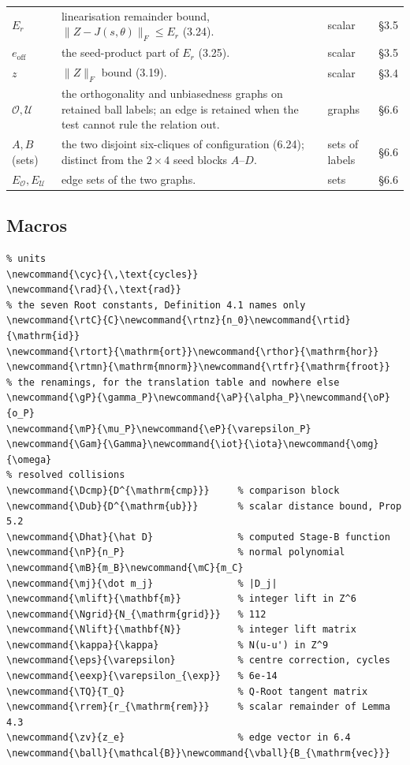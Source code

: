 \documentclass[11pt]{article}
\begin{document}
\begin{longtable}{@{}L{1.6cm}L{5.6cm}L{2.4cm}L{1.0cm}@{}}
$E_r$ & linearisation remainder bound, $\|Z-J(s,\theta)\|_F\le E_r$ (3.24). & scalar & \S3.5 \\
$e_{\mathrm{off}}$ & the seed-product part of $E_r$ (3.25). & scalar & \S3.5 \\
$z$ & $\|Z\|_F$ bound (3.19). & scalar & \S3.4 \\
$\mathcal{O},\mathcal{U}$ & the orthogonality and unbiasedness graphs on retained ball labels; an edge
  is retained when the test cannot rule the relation out. & graphs & \S6.6 \\
$A,B$ (sets) & the two disjoint six-cliques of configuration (6.24); distinct from the $2\times4$
  seed blocks $A$--$D$. & sets of labels & \S6.6 \\
$E_{\mathcal{O}},E_{\mathcal{U}}$ & edge sets of the two graphs. & sets & \S6.6 \\
\hline
\end{longtable}

\subsection*{Macros}

\begin{verbatim}
% units
\newcommand{\cyc}{\,\text{cycles}}
\newcommand{\rad}{\,\text{rad}}
% the seven Root constants, Definition 4.1 names only
\newcommand{\rtC}{C}\newcommand{\rtnz}{n_0}\newcommand{\rtid}{\mathrm{id}}
\newcommand{\rtort}{\mathrm{ort}}\newcommand{\rthor}{\mathrm{hor}}
\newcommand{\rtmn}{\mathrm{mnorm}}\newcommand{\rtfr}{\mathrm{froot}}
% the renamings, for the translation table and nowhere else
\newcommand{\gP}{\gamma_P}\newcommand{\aP}{\alpha_P}\newcommand{\oP}{o_P}
\newcommand{\mP}{\mu_P}\newcommand{\eP}{\varepsilon_P}
\newcommand{\Gam}{\Gamma}\newcommand{\iot}{\iota}\newcommand{\omg}{\omega}
% resolved collisions
\newcommand{\Dcmp}{D^{\mathrm{cmp}}}     % comparison block
\newcommand{\Dub}{D^{\mathrm{ub}}}       % scalar distance bound, Prop 5.2
\newcommand{\Dhat}{\hat D}               % computed Stage-B function
\newcommand{\nP}{n_P}                    % normal polynomial
\newcommand{\mB}{m_B}\newcommand{\mC}{m_C}
\newcommand{\mj}{\dot m_j}               % |D_j|
\newcommand{\mlift}{\mathbf{m}}          % integer lift in Z^6
\newcommand{\Ngrid}{N_{\mathrm{grid}}}   % 112
\newcommand{\Nlift}{\mathbf{N}}          % integer lift matrix
\newcommand{\kappa}{\kappa}              % N(u-u') in Z^9
\newcommand{\eps}{\varepsilon}           % centre correction, cycles
\newcommand{\eexp}{\varepsilon_{\exp}}   % 6e-14
\newcommand{\TQ}{T_Q}                    % Q-Root tangent matrix
\newcommand{\rrem}{r_{\mathrm{rem}}}     % scalar remainder of Lemma 4.3
\newcommand{\zv}{z_e}                    % edge vector in 6.4
\newcommand{\ball}{\mathcal{B}}\newcommand{\vball}{B_{\mathrm{vec}}}
\end{verbatim}
\end{document}
